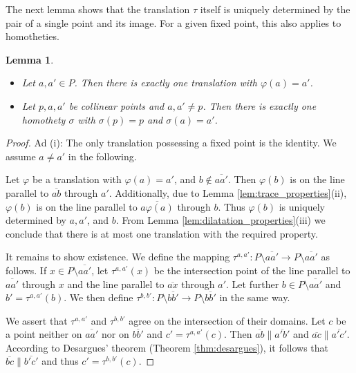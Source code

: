 \documentclass[11pt,a4paper]{article}
\newcommand{\lineab}[1]{\overline{#1}}
\newtheorem{lemma}[theorem]{Lemma}
\begin{document}
The next lemma shows that the translation $\tau$ itself is uniquely determined by the pair of a single point and its image. For a given fixed point, this also applies to homotheties.

\begin{lemma} \label{lem:translation_uniqueness}
\begin{itemize}
    \item[(i)] Let $a, a' \in P$. Then there is exactly one translation with $\varphi(a) = a'$.
    \item[(ii)] Let $p, a, a'$ be collinear points and $a, a' \neq p$. Then there is exactly one homothety $\sigma$ with $\sigma(p) = p$ and $\sigma(a) = a'$.
\end{itemize}
\end{lemma}

\begin{proof}
Ad (i): The only translation possessing a fixed point is the identity. We assume $a \neq a'$ in the following.

Let $\varphi$ be a translation with $\varphi(a) = a'$, and $b \notin \lineab{aa'}$. Then $\varphi(b)$ is on the line parallel to $\lineab{ab}$ through $a'$. Additionally, due to Lemma \ref{lem:trace_properties}(ii), $\varphi(b)$ is on the line parallel to $\lineab{a\varphi(a)}$ through $b$. Thus $\varphi(b)$ is uniquely determined by $a, a'$, and $b$. From Lemma \ref{lem:dilatation_properties}(iii) we conclude that there is at most one translation with the required property.

It remains to show existence. We define the mapping $\tau^{a,a'}: P \setminus \lineab{aa'} \to P \setminus \lineab{aa'}$ as follows. If $x \in P \setminus \lineab{aa'}$, let $\tau^{a,a'}(x)$ be the intersection point of the line parallel to $\lineab{aa'}$ through $x$ and the line parallel to $\lineab{ax}$ through $a'$. Let further $b \in P \setminus \lineab{aa'}$ and $b' = \tau^{a,a'}(b)$. We then define $\tau^{b,b'}: P \setminus \lineab{bb'} \to P \setminus \lineab{bb'}$ in the same way.

We assert that $\tau^{a,a'}$ and $\tau^{b,b'}$ agree on the intersection of their domains. Let $c$ be a point neither on $\lineab{aa'}$ nor on $\lineab{bb'}$ and $c' = \tau^{a,a'}(c)$. Then $\lineab{ab} \parallel \lineab{a'b'}$ and $\lineab{ac} \parallel \lineab{a'c'}$. According to Desargues' theorem (Theorem \ref{thm:desargues}), it follows that $\lineab{bc} \parallel \lineab{b'c'}$ and thus $c' = \tau^{b,b'}(c)$.


\end{proof}
\end{document}
